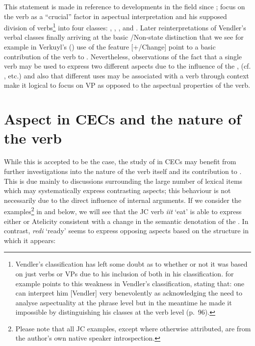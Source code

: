 This statement is made in reference to developments in the field since
; focus on the verb as a ``crucial'' factor in
aspectual interpretation and his supposed division of
verbs\footnote{Vendler's classification has left some doubt as to
  whether or not it was based on just verbs or VPs due to his
  inclusion of both in his classification.  \citet{Verkuyl1999} for
  example points to this weakness in Vendler's classification,
  stating that: one can interpret him [Vendler] very benevolently as
  acknowledging the need to analyse aspectuality at the phrase level
  but in the meantime he made it impossible by distinguishing his
  classes at the verb level (p.~96).}  into four classes: ,
, , and .  Later reinterpretations of
Vendler's verbal classes finally arriving at the basic \slash Non-state
distinction that we see for example in Verkuyl's (\citeyear{Verkuyl1993,Verkuyl1999}) use of
the feature [+/\textminus Change] point to a basic contribution of the verb to
. Nevertheless, observations of the fact that a single verb may
be used to express two different aspects due to the influence of the
, (cf. \citealt{Dowty1979,Dahl1981,Verkuyl1993,Tenny1994,MacDonald2008}, etc.) and
also that different uses may be associated with a verb through context
\citep[cf.][4]{Tenny1994} make it logical to focus on VP as opposed to the
aspectual properties of the verb.

\section{Aspect in CECs and the nature of the verb}\label{sec:1.4}

While this is accepted to be the case, the study of  in CECs may
benefit from further investigations into the nature of the verb itself
and its contribution to .  This is due mainly to discussions
surrounding the large number of lexical items which may systematically
express contrasting aspects; this behaviour is not necessarily due to
the direct influence of internal arguments.  If we consider the
 examples\footnote{Please note that all JC
  examples, except where otherwise attributed, are from the author's
  own native speaker introspection.} in  and 
below, we will see that the JC  verb \textit{iit}
`eat' is able to express either  or Atelicity consistent with
a change in the semantic denotation of the .  In
contrast, \textit{redi} `ready' seems to express opposing aspects
based on the structure in which it appears:

